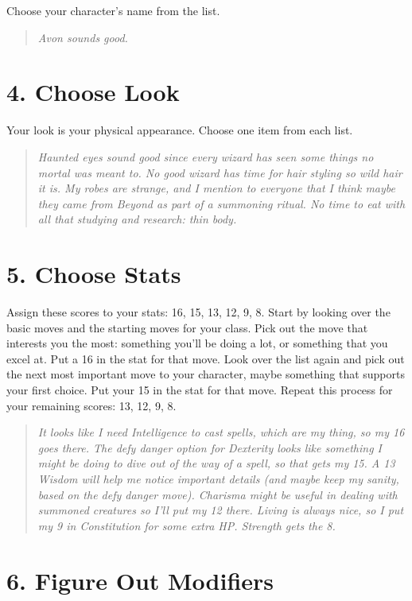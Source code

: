 Choose your character's name from the list.

\begin{quote}
\emph{Avon sounds good.}
\end{quote}
\section*{4. Choose Look}

Your look is your physical appearance. Choose one item from each list.

\begin{quote}
\emph{Haunted eyes sound good since every wizard has seen some things no mortal was meant to. No good wizard has time for hair styling so wild hair it is. My robes are strange, and I mention to everyone that I think maybe they came from Beyond as part of a summoning ritual. No time to eat with all that studying and research: thin body.}
\end{quote}
\section*{5. Choose Stats}

Assign these scores to your stats: 16, 15, 13, 12, 9, 8. Start by looking over the basic moves and the starting moves for your class. Pick out the move that interests you the most: something you'll be doing a lot, or something that you excel at. Put a 16 in the stat for that move. Look over the list again and pick out the next most important move to your character, maybe something that supports your first choice. Put your 15 in the stat for that move. Repeat this process for your remaining scores: 13, 12, 9, 8.

\begin{quote}
\emph{It looks like I need Intelligence to cast spells, which are my thing, so my 16 goes there. The defy danger option for Dexterity looks like something I might be doing to dive out of the way of a spell, so that gets my 15. A 13 Wisdom will help me notice important details (and maybe keep my sanity, based on the defy danger move). Charisma might be useful in dealing with summoned creatures so I'll put my 12 there. Living is always nice, so I put my 9 in Constitution for some extra HP\@. Strength gets the 8.}
\end{quote}
\section*{6. Figure Out Modifiers}

